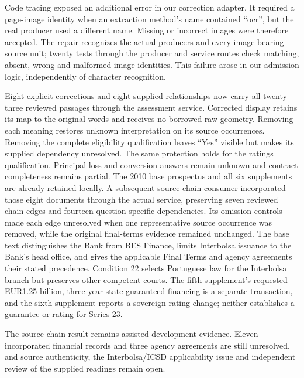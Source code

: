 Code tracing exposed an additional error in our correction adapter.  It required
a page-image identity when an extraction method's name contained ``ocr'', but
the real producer used a different name.  Missing or incorrect images were
therefore accepted.  The repair recognizes the actual producers and every
image-bearing source unit; twenty tests through the producer and service
routes check matching, absent, wrong and malformed image identities.  This
failure arose in our admission logic, independently of character recognition.

Eight explicit corrections and eight supplied relationships now carry all
twenty-three reviewed passages through the assessment service.  Corrected
display retains its map to the original words and receives no borrowed raw
geometry.  Removing each meaning restores unknown interpretation on its source
occurrences.  Removing the complete eligibility qualification leaves ``Yes''
visible but makes its supplied dependency unresolved.  The same protection
holds for the ratings qualification.  Principal-loss and conversion answers
remain unknown and contract completeness remains partial.  The 2010 base
prospectus and all six supplements are already retained locally.  A subsequent
source-chain consumer incorporated those eight documents through the actual
service, preserving seven reviewed chain edges and fourteen question-specific
dependencies.  Its omission controls made each edge unresolved when one
representative source occurrence was removed, while the original final-terms
evidence remained unchanged.  The base text distinguishes the Bank from BES
Finance, limits Interbolsa issuance to the Bank's head office, and gives the
applicable Final Terms and agency agreements their stated precedence.  Condition
22 selects Portuguese law for the Interbolsa branch but preserves other
competent courts.  The fifth supplement's requested EUR1.25 billion,
three-year state-guaranteed financing is a separate transaction, and the sixth
supplement reports a sovereign-rating change; neither establishes a guarantee or
rating for Series 23.

The source-chain result remains assisted development evidence.  Eleven
incorporated financial records and three agency agreements are still unresolved,
and source authenticity, the Interbolsa/ICSD applicability issue and independent
review of the supplied readings remain open.

